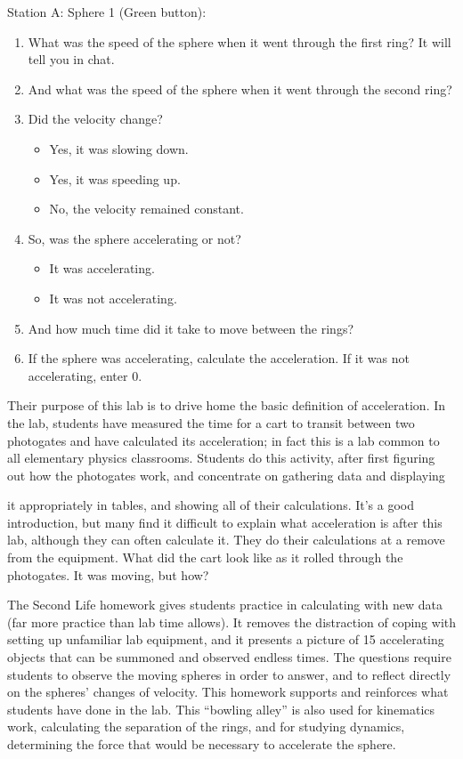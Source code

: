 \documentclass[11.5pt]{sig-alternate} %
\begin{document}
\begin{large}
Station A: Sphere 1 (Green button):
\begin{enumerate}[label=\alph*)]
    \item  What was the speed of the sphere when it went through the first ring? It will tell you in chat.
    \item  And what was the speed of the sphere when it went through the second ring?
    \item  Did the velocity change?
\begin{itemize}
    \item   Yes, it was slowing down.
    \item Yes, it was speeding up.
    \item  No, the velocity remained constant.
\end{itemize}
    \item So, was the sphere accelerating or not?
  \begin{itemize}
    \item It was accelerating.
    \item It was not accelerating.
  \end{itemize}
    \item  And how much time did it take to move between the rings?
    \item  If the sphere was accelerating, calculate the acceleration. If it was not accelerating, enter 0.
\end{enumerate}

Their purpose of this lab is to drive home the basic definition of acceleration. In the lab, students have measured the time for a cart to transit between two photogates and have calculated its acceleration; in fact this is a lab common to all elementary physics classrooms. Students do this activity, after first figuring out how the photogates work, and concentrate on gathering data and displaying

it appropriately in tables, and showing all of their calculations. It’s a good introduction, but many find it difficult to explain what acceleration is after this lab, although they can often calculate it. They do their calculations at a remove from the equipment. What did the cart look like as it rolled through the photogates. It was moving, but how?

The Second Life homework gives students practice in calculating with new data (far more practice than lab time allows). It removes the distraction of coping with setting up unfamiliar lab equipment, and it presents a picture of 15 accelerating objects that can be summoned and observed endless times. The questions require students to observe the moving spheres in order to answer, and to reflect directly on the spheres’ changes of velocity. This homework supports and reinforces what students have done in the lab. This “bowling alley” is also used for kinematics work, calculating the separation of the rings, and for studying dynamics, determining the force that would be necessary to accelerate the sphere.


\end{large}
\end{document}
